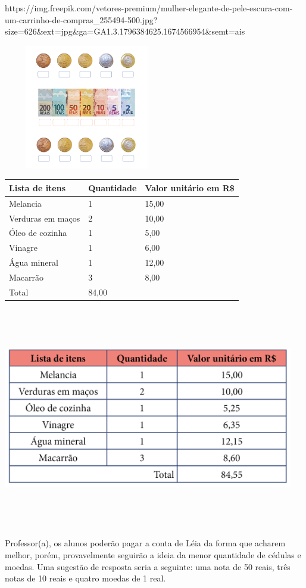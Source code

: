https://img.freepik.com/vetores-premium/mulher-elegante-de-pele-escura-com-um-carrinho-de-compras\_255494-500.jpg?size=626\&ext=jpg\&ga=GA1.3.1796384625.1674566954\&semt=ais

\includegraphics[width=2.86111in,height=2.14583in]{media/image74.png}

\begin{longtable}[]{@{}lll@{}}
\toprule
Lista de itens & Quantidade & Valor unitário em R\$\tabularnewline
\midrule
\endhead
Melancia & 1 & 15,00\tabularnewline
Verduras em maços & 2 & 10,00\tabularnewline
Óleo de cozinha & 1 & 5,00\tabularnewline
Vinagre & 1 & 6,00\tabularnewline
Água mineral & 1 & 12,00\tabularnewline
Macarrão & 3 & 8,00\tabularnewline
Total & 84,00\tabularnewline
\bottomrule
\end{longtable}

\includegraphics[width=5.00000in,height=3.80208in]{media/image75.png}

Professor(a), os alunos poderão pagar a conta de Léia da forma que
acharem melhor, porém, provavelmente seguirão a ideia da menor
quantidade de cédulas e moedas. Uma sugestão de resposta seria a seguinte: uma nota de 50 reais, três notas de 10 reais e quatro moedas de 1 real.

